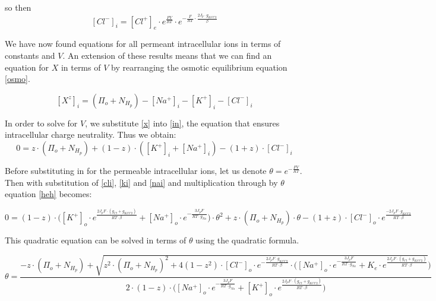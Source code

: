 \documentclass[a4paper,11pt]{article}
\begin{document}
so then
\begin{equation} \label{cli} \tag{S9}
[Cl^-]_i = [Cl^+]_e \cdot e^{\frac{FV}{RT}} \cdot e^{-\frac{F}{RT} \cdot \frac{2J_p \cdot g_{KCC2}}{\beta}}
\end{equation}

We have now found equations for all permeant intracellular ions in terms of constants and $V$. An extension of these results means that we can find an equation for $X$ in terms of $V$ by rearranging the osmotic equilibrium equation \eqref{osmo}.

\begin{equation} \label{x} \tag{S10}
[X^z]_i=(\Pi_o +N_{H_p})-[Na^+]_i-[K^+]_i-[Cl^-]_i
\end{equation}

In order to solve for $V$, we substitute \eqref{x} into \eqref{in}, the equation that ensures intracellular charge neutrality. Thus we obtain:
\begin{equation} \label{heh} \tag{S11}
0=z\cdot (\Pi_o + N_{H_p}) + (1-z) \cdot ([K^+]_i+[Na^+]_i)-(1+z) \cdot [Cl^-]_i
\end{equation}

Before substituting in for the permeable intracellular ions, let us denote $\theta = e^{-\frac{FV}{RT}}$. Then with substitution of \eqref{cli}, \eqref{ki} and \eqref{nai} and multiplication through by $\theta$ equation \ref{heh} becomes:
\begin{footnotesize}
\begin{equation*}
0=(1-z)\cdot \Big([K^+]_o \cdot e^{\frac{2 J_p F \cdot (g_{Cl}+ g_{KCC2})}{RT \cdot \beta}} +[Na^+]_o \cdot e^{-\frac{3J_pF}{RT\cdot g_{Na}}} \Big)\cdot \theta^2 + z\cdot (\Pi_o +N_{H_p})\cdot \theta - (1+z)\cdot [Cl^-]_o \cdot e^{\frac{-2J_pF\cdot g_{KCC2}}{RT \cdot \beta}}
\end{equation*}
\end{footnotesize}

This quadratic equation can be solved in terms of $\theta$ using the quadratic formula.

\begin{tiny}
\begin{equation} \label{q} \tag{S12}
\theta=\frac{-z \cdot (\Pi_o + N_{H_p} ) + \sqrt{z^2 \cdot (\Pi_o +N_{H_p})^2+4(1-z^2)\cdot [Cl^-]_o \cdot e^{-\frac{2J_pF\cdot g_{KCC2}}{ RT\cdot \beta}}\cdot\bigg([Na^+]_o \cdot e^{-\frac{3J_pF}{RT\cdot g_{Na}}}+K_e\cdot e^{\frac{2 J_p F \cdot (g_{Cl}+ g_{KCC2})}{RT \cdot \beta}}}\bigg)}{2\cdot(1-z)\cdot\bigg([Na^+]_o \cdot e^{-\frac{3J_pF}{RT\cdot g_{Na}}}+[K^+]_o\cdot e^{\frac{2 J_p F \cdot (g_{Cl}+ g_{KCC2})}{RT \cdot \beta}}\bigg)}    
\end{equation}

\end{tiny}
\end{document}
